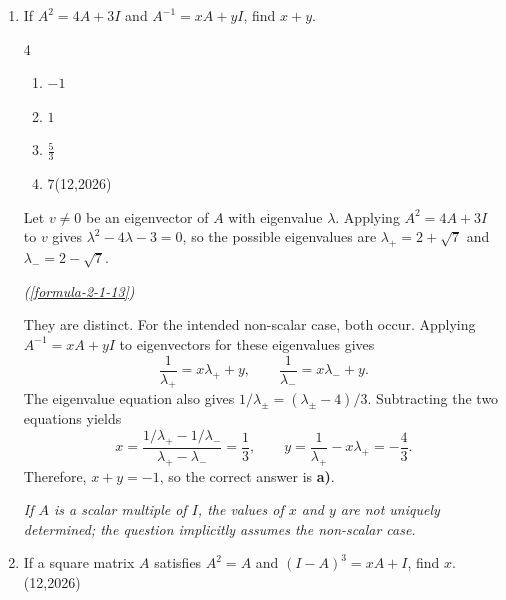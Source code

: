 \begin{enumerate}[label={},font=\normalfont,leftmargin=1.15cm,labelwidth=1.0cm,labelsep=0.15cm,itemindent=0pt,listparindent=0pt,itemsep=\baselineskip,parsep=0pt,topsep=0pt]
\item[2.2.1] If $A^2=4A+3I$ and $A^{-1}=xA+yI$, find $x+y$.

\begin{multicols}{4}
\begin{enumerate}
\setlength{\itemsep}{0pt}
    \item $-1$
    \item $1$
    \item $\frac53$
    \item $7$\nobreak\hfill\mbox{(12,2026)}
\end{enumerate}
\end{multicols}



\vspace{0.6em}\par\solution


Let $v\ne0$ be an eigenvector of $A$ with eigenvalue $\lambda$. Applying $A^2=4A+3I$ to $v$ gives $\lambda^2-4\lambda-3=0$, so the possible eigenvalues are $\lambda_+=2+\sqrt7$ and $\lambda_-=2-\sqrt7$.
\par\noindent\hfill\mbox{\textit{(\ref{formula-2-1-13})}}\par
They are distinct. For the intended non-scalar case, both occur. Applying $A^{-1}=xA+yI$ to eigenvectors for these eigenvalues gives
\[
\frac1{\lambda_+}=x\lambda_++y,\qquad \frac1{\lambda_-}=x\lambda_-+y.
\]
The eigenvalue equation also gives $1/\lambda_\pm=(\lambda_\pm-4)/3$. Subtracting the two equations yields
\[
x=\frac{1/\lambda_+-1/\lambda_-}{\lambda_+-\lambda_-}=\frac13,\qquad y=\frac1{\lambda_+}-x\lambda_+=-\frac43.
\]
Therefore, $x+y=-1$, so the correct answer is \textbf{a)}.

\textit{If $A$ is a scalar multiple of $I$, the values of $x$ and $y$ are not uniquely determined; the question implicitly assumes the non-scalar case.}
\item[2.2.2] If a square matrix $A$ satisfies $A^2=A$ and $(I-A)^3=xA+I$, find $x$.\nobreak\hfill\mbox{(12,2026)}



\vspace{0.6em}\par\solution



\end{enumerate}

